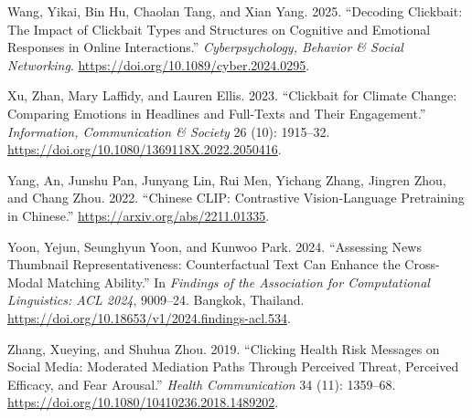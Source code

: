 \documentclass[
  12pt,
]{article}
\newlength{\cslhangindent}
\newenvironment{CSLReferences}[2] %
 {\begin{list}{}{%
  \setlength{\itemindent}{0pt}
  \setlength{\leftmargin}{0pt}
  \setlength{\parsep}{0pt}
  \ifodd #1
   \setlength{\leftmargin}{\cslhangindent}
   \setlength{\itemindent}{-1\cslhangindent}
  \fi
  \setlength{\itemsep}{#2\baselineskip}}}
 {\end{list}}
\begin{document}
\begin{CSLReferences}{1}{0}
Wang, Yikai, Bin Hu, Chaolan Tang, and Xian Yang. 2025. {``Decoding
Clickbait: The Impact of Clickbait Types and Structures on Cognitive and
Emotional Responses in Online Interactions.''} \emph{Cyberpsychology,
Behavior \& Social Networking}.
\url{https://doi.org/10.1089/cyber.2024.0295}.

Xu, Zhan, Mary Laffidy, and Lauren Ellis. 2023. {``Clickbait for Climate
Change: Comparing Emotions in Headlines and Full-Texts and Their
Engagement.''} \emph{Information, Communication \& Society} 26 (10):
1915--32. \url{https://doi.org/10.1080/1369118X.2022.2050416}.

Yang, An, Junshu Pan, Junyang Lin, Rui Men, Yichang Zhang, Jingren Zhou,
and Chang Zhou. 2022. {``{Chinese} {CLIP}: Contrastive Vision-Language
Pretraining in {Chinese}.''} \url{https://arxiv.org/abs/2211.01335}.

Yoon, Yejun, Seunghyun Yoon, and Kunwoo Park. 2024. {``Assessing News
Thumbnail Representativeness: Counterfactual Text Can Enhance the
Cross-Modal Matching Ability.''} In \emph{Findings of the Association
for Computational Linguistics: ACL 2024}, 9009--24. Bangkok, Thailand.
\url{https://doi.org/10.18653/v1/2024.findings-acl.534}.

Zhang, Xueying, and Shuhua Zhou. 2019. {``Clicking Health Risk Messages
on Social Media: Moderated Mediation Paths Through Perceived Threat,
Perceived Efficacy, and Fear Arousal.''} \emph{Health Communication} 34
(11): 1359--68. \url{https://doi.org/10.1080/10410236.2018.1489202}.

\end{CSLReferences}
\end{document}
